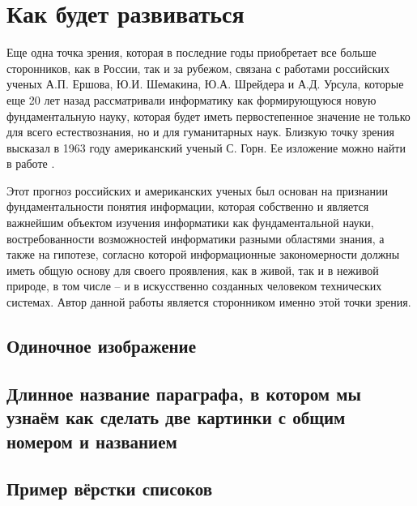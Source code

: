 \chapter{Как будет развиваться} \label{chapt2}



Еще одна точка зрения, которая в последние годы приобретает все больше сторонников, как в России, так и за рубежом, связана с работами российских ученых А.П. Ершова, Ю.И. Шемакина, Ю.А. Шрейдера и А.Д. Урсула, которые еще 20 лет назад рассматривали информатику как формирующуюся новую фундаментальную науку, которая будет иметь первостепенное значение не только для всего естествознания, но и для гуманитарных наук. Близкую точку зрения высказал в 1963 году американский ученый С. Горн. Ее изложение можно найти в работе \cite{bib301}.

Этот прогноз российских и американских ученых был основан на признании фундаментальности понятия информации, которая собственно и является важнейшим объектом изучения  информатики как фундаментальной науки, востребованности возможностей информатики разными областями знания, а также на гипотезе, согласно которой информационные закономерности должны иметь общую основу для своего проявления, как в живой, так и в неживой природе, в том числе – и в искусственно созданных человеком технических системах. Автор данной работы является сторонником именно этой точки зрения.

\section{Одиночное изображение} \label{sect2_1}



\section{Длинное название параграфа, в котором мы узнаём как сделать две картинки с общим номером и названием} \label{sect2_2}



\section{Пример вёрстки списоков} \label{sect2_3}




\clearpage